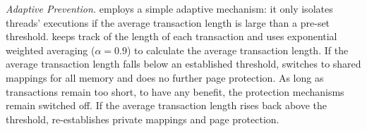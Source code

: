 \emph{Adaptive Prevention.}
\SheriffProtect{} employs a simple adaptive mechanism: it only isolates threads' executions if the average transaction length is large than a pre-set threshold. \SheriffProtect{} keeps  track of the length of each transaction and uses exponential weighted averaging ($\alpha = 0.9$) to calculate the average transaction length. If the average transaction length falls below an established threshold, \SheriffProtect{} switches to shared mappings for all memory and does no further page protection. As long as transactions remain too short, 
\SheriffProtect{} to have any benefit, the protection mechanisms remain switched off. If the average
transaction length rises back above the threshold, \SheriffProtect{} re-establishes private mappings and page protection.